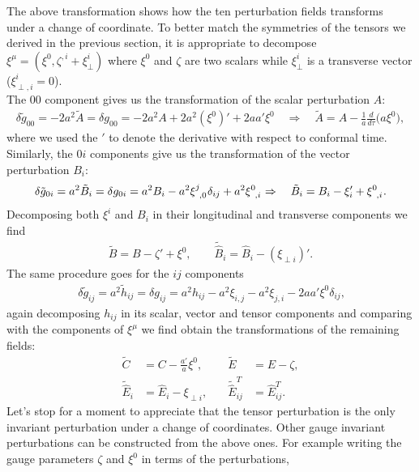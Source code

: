 The above transformation shows how the ten perturbation fields transforms under a change of coordinate. To better match the symmetries of the tensors we derived in the previous section, it is appropriate to decompose $\xi^\mu=(\xi^0,\zeta^{,i}+\xi^i_{\perp})$ where $\xi^0$ and $\zeta$ are two scalars while $\xi_\perp^i$ is a transverse vector ($\xi^i_{\perp,i}=0$).\\ The $00$ component gives us the transformation of the scalar perturbation $A$:
\begin{align}
    \delta \tilde g_{00}=-2a^2\tilde A=\delta g_{00}=- 2a^2 A+2a^2(\xi^{0})'+2aa'\xi^0\quad \Rightarrow\quad\boxed{\tilde A=A-\frac{1}{a}\frac{d}{d\tau}\bigg(a\xi^0\bigg)},\label{eq:gauge_A}
\end{align}
where we used the $'$ to denote the derivative with respect to conformal time.\\
Similarly, the $0i$ components give us the transformation of the vector perturbation $B_i$:
\begin{align*}
    \delta \tilde g_{0i}=a^2\tilde B_i=\delta g_{0i}=a^2B_i-a^2\tensor{\xi}{^j_{,0}}\delta_{ij}+a^2\tensor{\xi}{^0_{,i}} \Rightarrow\quad \tilde B_i=B_i-\xi_{i}'+\tensor{\xi}{^0_{,i}}.
\end{align*}
Decomposing both $\xi^i$ and $B_i$ in their longitudinal and transverse components we find
\begin{align}\label{eq:gauge_B}
    \tilde B=B-\zeta'+\xi^0,\qquad
    \tilde{\hat B}_i=\hat B_i-(\xi_{\perp i})'.
\end{align}
The same procedure goes for the $ij$ components
\begin{align*}\
    \delta \tilde g_{ij}=a^2\tilde h_{ij}=\delta g_{ij}=a^2h_{ij}-a^2\xi_{i,j}-a^2\xi_{j,i}-2aa'\xi^0\delta_{ij},
\end{align*}
again decomposing $h_{ij}$ in its scalar, vector and tensor components and comparing with the components of $\xi^\mu$ we find obtain the transformations of the remaining fields:
\begin{align}
    \tilde C&=C-\frac{a'}{a}\xi^0,&\quad
    \tilde E&=E-\zeta,\label{eq:gauge_CE}\\
    \tilde{\hat E}_i&=\hat E_i-\xi_{\perp i },&\quad
    \tilde{\hat E}^T_{ij}&=\hat E^T_{ij}.\label{eq:gauge_h}
\end{align} 
Let's stop for a moment to appreciate that the tensor perturbation is the only invariant perturbation under a change of coordinates. Other gauge invariant perturbations can be constructed from the above ones. For example writing the gauge parameters $\zeta$ and $\xi^0$ in terms of the perturbations,

